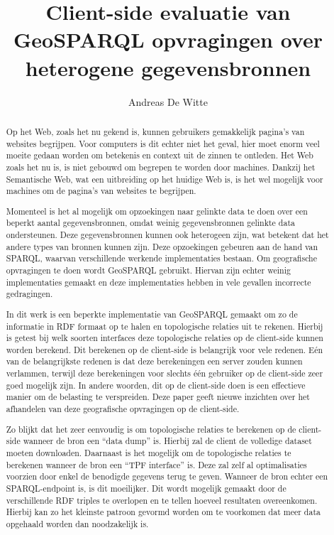 \documentclass[twocolumn]{phdsymp} %
\begin{document}
\title{Client-side evaluatie van GeoSPARQL opvragingen over heterogene gegevensbronnen} %

\author{Andreas De Witte}


\maketitle

\begin{abstract}
    Op het Web, zoals het nu gekend is, kunnen gebruikers gemakkelijk pagina's van websites begrijpen. Voor computers is dit echter niet het geval, hier moet enorm veel moeite gedaan worden om betekenis en context uit de zinnen te ontleden. Het Web zoals het nu is, is niet gebouwd om begrepen te worden door machines. Dankzij het Semantische Web, wat een uitbreiding op het huidige Web is, is het wel mogelijk voor machines om de pagina's van websites te begrijpen.
    
    Momenteel is het al mogelijk om opzoekingen naar gelinkte data te doen over een beperkt aantal gegevensbronnen, omdat weinig gegevensbronnen gelinkte data ondersteunen. Deze gegevensbronnen kunnen ook heterogeen zijn, wat betekent dat het andere types van bronnen kunnen zijn. Deze opzoekingen gebeuren aan de hand van SPARQL, waarvan verschillende werkende implementaties bestaan. Om geografische opvragingen te doen wordt GeoSPARQL gebruikt. Hiervan zijn echter weinig implementaties gemaakt en deze implementaties hebben in vele gevallen incorrecte gedragingen.
    
    In dit werk is een beperkte implementatie van GeoSPARQL gemaakt om zo de informatie in RDF formaat op te halen en topologische relaties uit te rekenen. Hierbij is getest bij welk soorten interfaces deze topologische relaties op de client-side kunnen worden berekend. Dit berekenen op de client-side is belangrijk voor vele redenen. Eén van de belangrijkste redenen is dat deze berekeningen een server zouden kunnen verlammen, terwijl deze berekeningen voor slechts één gebruiker op de client-side zeer goed mogelijk zijn. In andere woorden, dit op de client-side doen is een effectieve manier om de belasting te verspreiden. Deze paper geeft nieuwe inzichten over het afhandelen van deze geografische opvragingen op de client-side.

    Zo blijkt dat het zeer eenvoudig is om topologische relaties te berekenen op de client-side wanneer de bron een ``data dump'' is. Hierbij zal de client de volledige dataset moeten downloaden. Daarnaast is het mogelijk om de topologische relaties te berekenen wanneer de bron een ``TPF interface'' is. Deze zal zelf al optimalisaties voorzien door enkel de benodigde gegevens terug te geven. Wanneer de bron echter een SPARQL-endpoint is, is dit moeilijker. Dit wordt mogelijk gemaakt door de verschillende RDF triples te overlopen en te tellen hoeveel resultaten overeenkomen. Hierbij kan zo het kleinste patroon gevormd worden om te voorkomen dat meer data opgehaald worden dan noodzakelijk is.
    

\end{abstract}
\end{document}

